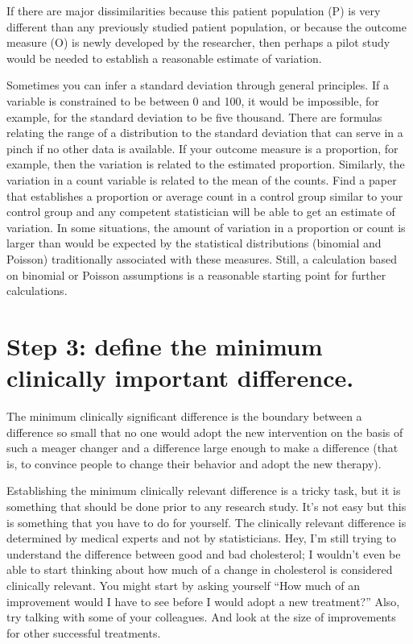 \documentclass[
  letterpaper,
  DIV=11,
  numbers=noendperiod]{scrreprt}
\begin{document}
If there are major dissimilarities because this patient population (P)
is very different than any previously studied patient population, or
because the outcome measure (O) is newly developed by the researcher,
then perhaps a pilot study would be needed to establish a reasonable
estimate of variation.

Sometimes you can infer a standard deviation through general principles.
If a variable is constrained to be between 0 and 100, it would be
impossible, for example, for the standard deviation to be five thousand.
There are formulas relating the range of a distribution to the standard
deviation that can serve in a pinch if no other data is available. If
your outcome measure is a proportion, for example, then the variation is
related to the estimated proportion. Similarly, the variation in a count
variable is related to the mean of the counts. Find a paper that
establishes a proportion or average count in a control group similar to
your control group and any competent statistician will be able to get an
estimate of variation. In some situations, the amount of variation in a
proportion or count is larger than would be expected by the statistical
distributions (binomial and Poisson) traditionally associated with these
measures. Still, a calculation based on binomial or Poisson assumptions
is a reasonable starting point for further calculations.

\section{Step 3: define the minimum clinically important
difference.}\label{step-3-define-the-minimum-clinically-important-difference.}

The minimum clinically significant difference is the boundary between a
difference so small that no one would adopt the new intervention on the
basis of such a meager changer and a difference large enough to make a
difference (that is, to convince people to change their behavior and
adopt the new therapy).

Establishing the minimum clinically relevant difference is a tricky
task, but it is something that should be done prior to any research
study. It's not easy but this is something that you have to do for
yourself. The clinically relevant difference is determined by medical
experts and not by statisticians. Hey, I'm still trying to understand
the difference between good and bad cholesterol; I wouldn't even be able
to start thinking about how much of a change in cholesterol is
considered clinically relevant. You might start by asking yourself ``How
much of an improvement would I have to see before I would adopt a new
treatment?'' Also, try talking with some of your colleagues. And look at
the size of improvements for other successful treatments.
\end{document}
